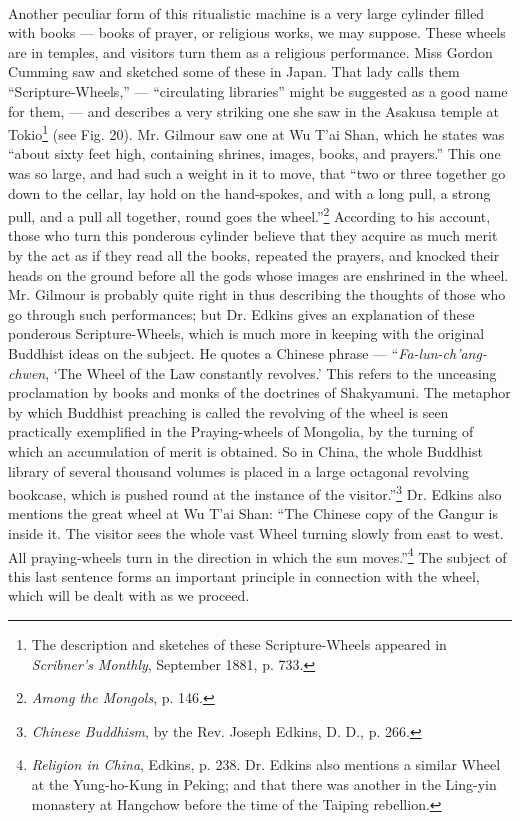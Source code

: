 \documentclass[a4paper, 11pt, oneside, polutonikogreek, english]{article}
\begin{document}
\paragraph{}
Another peculiar form of this ritualistic machine is a very large cylinder filled with books --- books of prayer, or religious works, we may suppose. These wheels are in temples, and visitors turn them as a religious performance. Miss Gordon Cumming saw and sketched some of these in Japan. That lady calls them ``Scripture-Wheels,'' --- ``circulating libraries'' might be suggested as a good name for them, --- and describes a very striking one she saw in the Asakusa temple at Tokio\footnote{The description and sketches of these Scripture-Wheels appeared in \emph{Scribner's Monthly}, September 1881, p. 733.} (see Fig. 20). Mr. Gilmour saw one at Wu T'ai Shan, which he states was ``about sixty feet high, containing shrines, images, books, and prayers.'' This one was so large, and had such a weight in it to move, that ``two or three together go down to the cellar, lay hold on the hand-spokes, and with a long pull, a strong pull, and a pull all together, round goes the wheel.''\footnote{\emph{Among the Mongols}, p. 146.} According to his account, those who turn this ponderous cylinder believe that they acquire as much merit by the act as if they read all the books, repeated the prayers, and knocked their heads on the ground before all the gods whose images are enshrined in the wheel. Mr. Gilmour is probably quite right in thus describing the thoughts of those who go through such performances; but Dr. Edkins gives an explanation of these ponderous Scripture-Wheels, which is much more in keeping with the original Buddhist ideas on the subject. He quotes a Chinese phrase --- ``\emph{Fa-lun-ch'ang-chwen}, `The Wheel of the Law constantly revolves.' This refers to the unceasing proclamation by books and monks of the doctrines of Shakyamuni. The metaphor by which Buddhist preaching is called the revolving of the wheel is seen practically exemplified in the Praying-wheels of Mongolia, by the turning of which an accumulation of merit is obtained. So in China, the whole Buddhist library of several thousand volumes is placed in a large octagonal revolving bookcase, which is pushed round at the instance of the visitor.''\footnote{\emph{Chinese Buddhism}, by the Rev. Joseph Edkins, D. D., p. 266.} Dr. Edkins also mentions the great wheel at Wu T'ai Shan: ``The Chinese copy of the Gangur is inside it. The visitor sees the whole vast Wheel turning slowly from east to west. All praying-wheels turn in the direction in which the sun moves.''\footnote{\emph{Religion in China}, Edkins, p. 238. Dr. Edkins also mentions a similar Wheel at the Yung-ho-Kung in Peking; and that there was another in the Ling-yin monastery at Hangchow before the time of the Taiping rebellion.} The subject of this last sentence forms an important principle in connection with the wheel, which will be dealt with as we proceed.
\end{document}
